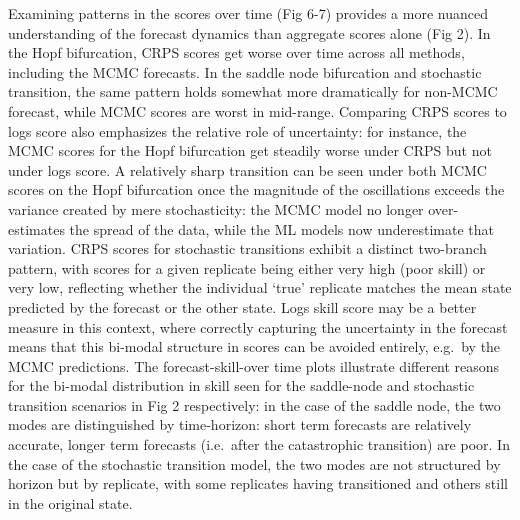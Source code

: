 \documentclass{article}
\begin{document}
Examining patterns in the scores over time (Fig 6-7) provides a more
nuanced understanding of the forecast dynamics than aggregate scores
alone (Fig 2). In the Hopf bifurcation, CRPS scores get worse over time
across all methods, including the MCMC forecasts. In the saddle node
bifurcation and stochastic transition, the same pattern holds somewhat
more dramatically for non-MCMC forecast, while MCMC scores are worst in
mid-range. Comparing CRPS scores to logs score also emphasizes the
relative role of uncertainty: for instance, the MCMC scores for the Hopf
bifurcation get steadily worse under CRPS but not under logs score. A
relatively sharp transition can be seen under both MCMC scores on the
Hopf bifurcation once the magnitude of the oscillations exceeds the
variance created by mere stochasticity: the MCMC model no longer
over-estimates the spread of the data, while the ML models now
underestimate that variation. CRPS scores for stochastic transitions
exhibit a distinct two-branch pattern, with scores for a given replicate
being either very high (poor skill) or very low, reflecting whether the
individual `true' replicate matches the mean state predicted by the
forecast or the other state. Logs skill score may be a better measure in
this context, where correctly capturing the uncertainty in the forecast
means that this bi-modal structure in scores can be avoided entirely,
e.g.~by the MCMC predictions. The forecast-skill-over time plots
illustrate different reasons for the bi-modal distribution in skill seen
for the saddle-node and stochastic transition scenarios in Fig 2
respectively: in the case of the saddle node, the two modes are
distinguished by time-horizon: short term forecasts are relatively
accurate, longer term forecasts (i.e.~after the catastrophic transition)
are poor. In the case of the stochastic transition model, the two modes
are not structured by horizon but by replicate, with some replicates
having transitioned and others still in the original state.
\end{document}
